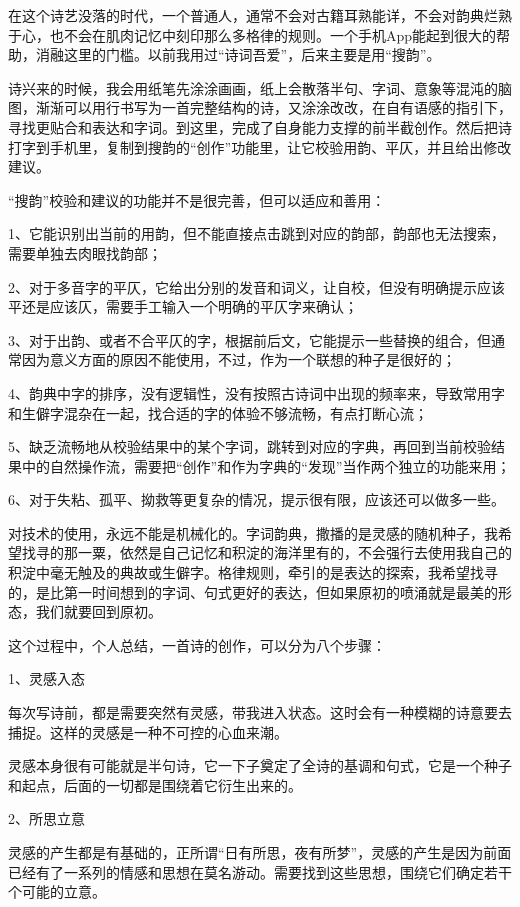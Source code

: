 \documentclass{article}
\begin{document}
在这个诗艺没落的时代，一个普通人，通常不会对古籍耳熟能详，不会对韵典烂熟于心，也不会在肌肉记忆中刻印那么多格律的规则。一个手机App能起到很大的帮助，消融这里的门槛。以前我用过``诗词吾爱''，后来主要是用``搜韵''。

诗兴来的时候，我会用纸笔先涂涂画画，纸上会散落半句、字词、意象等混沌的脑图，渐渐可以用行书写为一首完整结构的诗，又涂涂改改，在自有语感的指引下，寻找更贴合和表达和字词。到这里，完成了自身能力支撑的前半截创作。然后把诗打字到手机里，复制到搜韵的``创作''功能里，让它校验用韵、平仄，并且给出修改建议。

``搜韵''校验和建议的功能并不是很完善，但可以适应和善用：

1、它能识别出当前的用韵，但不能直接点击跳到对应的韵部，韵部也无法搜索，需要单独去肉眼找韵部；

2、对于多音字的平仄，它给出分别的发音和词义，让自校，但没有明确提示应该平还是应该仄，需要手工输入一个明确的平仄字来确认；

3、对于出韵、或者不合平仄的字，根据前后文，它能提示一些替换的组合，但通常因为意义方面的原因不能使用，不过，作为一个联想的种子是很好的；

4、韵典中字的排序，没有逻辑性，没有按照古诗词中出现的频率来，导致常用字和生僻字混杂在一起，找合适的字的体验不够流畅，有点打断心流；

5、缺乏流畅地从校验结果中的某个字词，跳转到对应的字典，再回到当前校验结果中的自然操作流，需要把``创作''和作为字典的``发现''当作两个独立的功能来用；

6、对于失粘、孤平、拗救等更复杂的情况，提示很有限，应该还可以做多一些。

对技术的使用，永远不能是机械化的。字词韵典，撒播的是灵感的随机种子，我希望找寻的那一粟，依然是自己记忆和积淀的海洋里有的，不会强行去使用我自己的积淀中毫无触及的典故或生僻字。格律规则，牵引的是表达的探索，我希望找寻的，是比第一时间想到的字词、句式更好的表达，但如果原初的喷涌就是最美的形态，我们就要回到原初。

这个过程中，个人总结，一首诗的创作，可以分为八个步骤：

1、灵感入态

每次写诗前，都是需要突然有灵感，带我进入状态。这时会有一种模糊的诗意要去捕捉。这样的灵感是一种不可控的心血来潮。

灵感本身很有可能就是半句诗，它一下子奠定了全诗的基调和句式，它是一个种子和起点，后面的一切都是围绕着它衍生出来的。

2、所思立意

灵感的产生都是有基础的，正所谓``日有所思，夜有所梦''，灵感的产生是因为前面已经有了一系列的情感和思想在莫名游动。需要找到这些思想，围绕它们确定若干个可能的立意。
\end{document}
